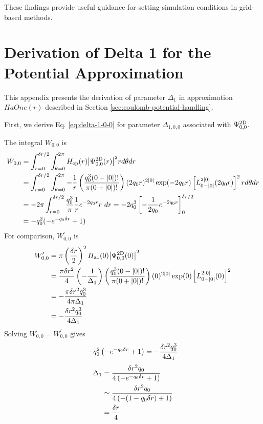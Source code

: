 \documentclass[a4paper,11pt]{article}
\begin{document}
These findings provide useful guidance for setting simulation conditions in
grid-based methods.


\printbibliography[heading=bibintoc, title={References}]


\appendix
\section{Derivation of Delta 1 for the Potential Approximation}
\label{chap:appendix_derivation_derivation}

This appendix presents the derivation of parameter $\Delta_1$ in approximation
$HaOne(r)$ described in Section \ref{sec:coulomb-potential-handling}.

First, we derive Eq. \eqref{eq:delta-1-0-0} for parameter
$\Delta_{1,0,0}$ associated with $\Psi^{\mathrm{2D}}_{0,0}$.

The integral $W_{0,0}$ is
\begin{align}
  W_{0,0}
   &= \int_{r=0}^{\deltar/2}\int_{\theta=0}^{2\pi}
      \Hep(r)\abs{\PsiTwoD_{0,0}(r)}^2rd\theta dr\notag\\
   &= \int_{r=0}^{\deltar/2}\int_{\theta=0}^{2\pi}
      -\frac{1}{r}\left(\frac{q_0^3(0-\abs{0})!}{\pi(0+\abs{0})!}\right)
      (2q_0r)^{2\abs{0}}\exp(-2q_0r)
      \left[L_{0-\abs{0}}^{2\abs{0}}(2q_0r)\right]^2 rd\theta dr\notag\\
   &= -2\pi\int_{r=0}^{\deltar/2}\frac{q_0^3}{\pi}\frac{1}{r}e^{-2q_0r}r\ dr=-2q_0^3
      \left[-\frac{1}{2q_0}e^{-2q_0r}\right]_{0}^{\deltar/2}\notag\\
   &=-q_0^2(-e^{-q_0\deltar}+1)
\end{align}
For comparison, $W_{0,0}^\prime$ is
\begin{align}
    W_{0,0}^\prime
    &=\pi\left(\frac{\delta r}{2}\right)^2
       H_{\mathrm{a1}}(0){\left| \Psi^{\mathrm{2D}}_{0,0}(0) \right|}^2\notag\\
    &=\frac{\pi\delta r^2}{4}\left(-\frac{1}{\Delta_1}\right)
    \left(\frac{q_0^3(0-{\left| 0 \right|})!}{\pi(0+{\left| 0 \right|})!}\right)
    (0)^{2{\left| 0 \right|}}\exp(0)\left[L_{0-{\left| 0 \right|}}^{2{\left| 0 \right|}}(0)\right]^2\notag\\
    &= -\frac{\pi\delta r^2q_0^3}{4\pi\Delta_1}\notag\\
    &= -\frac{\delta r^2q_0^3}{4\Delta_1}
\end{align}
Solving $W_{0,0}=W_{0,0}^\prime$ gives
\begin{equation}
-q_0^2\left(-e^{-q_0\delta r}+1\right)=-\frac{\delta r^2q_0^3}{4\Delta_1}
\end{equation}
\begin{align}
\Delta_1&=\frac{\delta r^2q_0}{4\left(-e^{-q_0\delta r}+1\right)}\notag\\
&\simeq\frac{\delta r^2q_0}{4\left(-(1-q_0\delta r)+1\right)}\notag\\
&=\frac{\delta r}{4}
\end{align}
\end{document}
